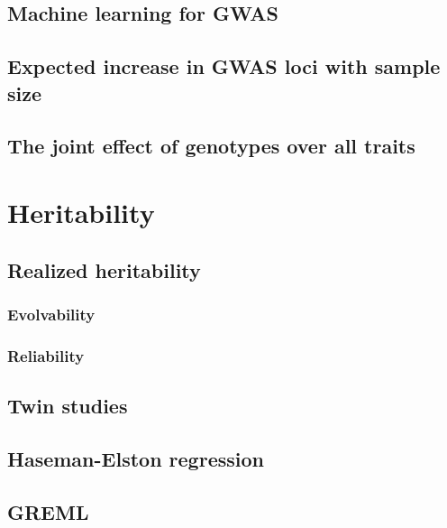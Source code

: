 \documentclass[]{book}
\theoremstyle{definition}
\theoremstyle{definition}
\theoremstyle{definition}
\theoremstyle{remark}
\begin{document}
\section{Machine learning for GWAS}\label{machine-learning-for-gwas}

\section{Expected increase in GWAS loci with sample
size}\label{expected-increase-in-gwas-loci-with-sample-size}

\section{The joint effect of genotypes over all
traits}\label{the-joint-effect-of-genotypes-over-all-traits}

\chapter{Heritability}\label{heritability}

\section{Realized heritability}\label{realized-heritability}

\subsection{Evolvability}\label{evolvability}

\subsection{Reliability}\label{reliability}

\section{Twin studies}\label{twin-studies}

\section{Haseman-Elston regression}\label{haseman-elston-regression}

\section{GREML}\label{greml}
\end{document}
